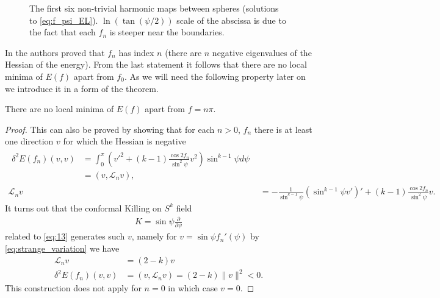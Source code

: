 \begin{figure}[ht]
  \centering
  
  \caption{The first six non-trivial harmonic maps between spheres
    (solutions to \eqref{eq:f_psi_EL}). $\ln(\tan(\psi/2))$ scale of
    the abscissa is due to the fact that each $f_n$ is steeper near
    the boundaries.}
  \label{fig:Harmonic_maps}
\end{figure}

In \cite{Corlette2001} the authors proved that $f_n$ has index $n$
(there are $n$ negative eigenvalues of the Hessian of the
energy). From the last statement it follows that there are no local
minima of $E(f)$ apart from $f_0$. As we will need the following
property later on we introduce it in a form of the theorem.
\begin{theorem}
  \label{thm:harmonic-map-index}
  There are no local minima of $E(f)$ apart from $f=n\pi$.
\end{theorem}
\begin{proof}
  This can also be proved by showing that for each $n>0$, $f_n$ there
  is at least one direction $v$ for which the Hessian is negative
  \begin{align}\label{eq:30}
    \begin{split}
      \delta^2E(f_n)(v,v) &=\int_0^{\pi} \left(
        v'^2+(k-1)\frac{\cos2f_n}{\sin^2\psi}v^2 \right)\sin^{k-1}\psi
      d\psi\\
      &=(v,\mathcal{L}_n v),
    \end{split}\\
    \mathcal{L}_nv&=-\frac{1}{\sin^{k-1}\psi}\left(\sin^{k-1}\psi
      v'\right)'+(k-1)\frac{\cos2f_n}{\sin^2\psi}v.
  \end{align}
  It turns out that the conformal Killing on $S^k$
  field
  \begin{align}
    \label{eq:31}
    K=\sin\psi\frac{\partial}{\partial\psi}
  \end{align}
  related to \eqref{eq:13} generates such $v$, namely for $v=\sin\psi
  f_n'(\psi)$ by \eqref{eq:strange_variation} we have
  \begin{align}
    \label{eq:32}
    \mathcal{L}_n v&=(2-k)v\\
    \delta^2 E(f_n)(v,v)&=(v,\mathcal{L}_n v)=(2-k)\lVert v\rVert^2<0.
  \end{align}
  This construction does not apply for $n=0$ in which case $v=0$.
\end{proof}

